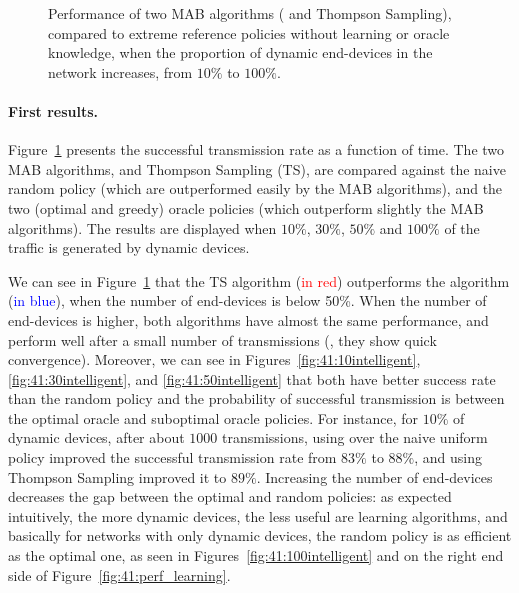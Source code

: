 \begin{figure}[!h]
{    \label{fig:41:100intelligent}}
    \caption{Performance of two MAB algorithms (\UCB{} and Thompson Sampling), compared to extreme reference policies without learning or oracle knowledge, when the proportion of dynamic end-devices in the network increases, from $10\%$ to $100\%$.}
    \label{fig:41:from10to100}
    \vspace*{-10pt}
\end{figure}


\paragraph{First results.}
%
Figure~\ref{fig:41:from10to100} presents the successful transmission rate as a function of time.
The two MAB algorithms, \UCB{} and Thompson Sampling (TS), are compared against the naive random policy (which are outperformed easily by the MAB algorithms), and the two (optimal and greedy) oracle policies (which outperform slightly the MAB algorithms).
The results are displayed when $10\%$, $30\%$, $50\%$ and $100\%$ of the traffic is generated by dynamic devices.


We can see in Figure~\ref{fig:41:from10to100} that the TS algorithm (\textcolor{red}{in red}) outperforms the \UCB{} algorithm (\textcolor{blue}{in blue}), when the number of end-devices is below 50\%. When the number of end-devices is higher, both algorithms have almost the same performance, and perform well after a small number of transmissions (\ie, they show quick convergence).
Moreover, we can see in Figures~\ref{fig:41:10intelligent}, \ref{fig:41:30intelligent}, and \ref{fig:41:50intelligent} that both have better success rate than the random policy and the probability of successful transmission is between the optimal oracle and suboptimal oracle policies.
For instance, for $10\%$ of dynamic devices, after about $1000$ transmissions, using \UCB{} over the naive uniform policy improved the successful transmission rate from $83\%$ to $88\%$, and using Thompson Sampling improved it to $89\%$.
Increasing the number of end-devices decreases the gap between the optimal and random policies:
as expected intuitively, the more dynamic devices, the less useful are learning algorithms, and basically for networks with only dynamic devices, the random policy is as efficient as the optimal one, as seen in Figures~\ref{fig:41:100intelligent} and on the right end side of Figure~\ref{fig:41:perf_learning}.

